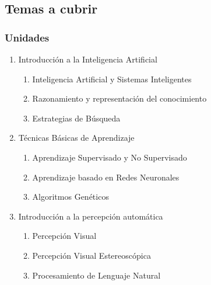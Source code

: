 
\begin{frame}
\section{Temas a cubrir}
\frametitle{Unidades }
\begin{enumerate}

\item Introducción a la Inteligencia Artificial
\begin{enumerate}
\item Inteligencia Artificial y Sistemas Inteligentes
\item Razonamiento y representación del conocimiento
\item Estrategias de Búsqueda
\end{enumerate}

\item Técnicas Básicas de Aprendizaje
\begin{enumerate}
\item Aprendizaje Supervisado y No Supervisado
\item Aprendizaje basado en Redes Neuronales
\item Algoritmos Genéticos
\end{enumerate}

\item Introducción a la percepción automática
\begin{enumerate}
\item Percepción Visual
\item Percepción Visual Estereoscópica
\item Procesamiento de Lenguaje Natural
\end{enumerate}

\end{enumerate}

\end{frame}
